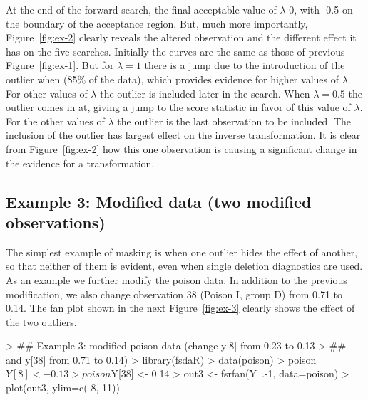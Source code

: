 \documentclass[article,shortnames,nojss]{jss}
\begin{document}
At the end of the forward search, the final acceptable value of $\lambda$ 0, with -0.5 on the boundary of the acceptance region. But, much more importantly, Figure~\ref{fig:ex-2} clearly reveals the altered observation and the different effect it has on the five searches. Initially the curves are the same as those of previous Figure~\ref{fig:ex-1}. But for $\lambda=1$ there is a jump due to the introduction of the outlier when (85\% of the data), which provides evidence for higher values of $\lambda$. For other values of $\lambda$ the outlier is included later in the search. When $\lambda=0.5$ the outlier comes in at, giving a jump to the score statistic in favor of this value of $\lambda$. For the other values of $\lambda$ the outlier is the last observation to be included. The inclusion of the outlier has  largest effect on the inverse transformation. It is clear from Figure~\ref{fig:ex-2} how this one observation is causing a significant change in the evidence for a transformation.

\subsection[Example 3: Modified poison data (two modified observations)]{Example 3: Modified  data (two modified observations)}

The simplest example of masking is when one outlier hides the effect of another, so that neither of them is evident, even when single deletion diagnostics are used. As an example we further modify the poison data. In addition to the previous modification, we also change observation 38 (Poison I, group D) from 0.71 to 0.14. The fan plot shown in the next Figure~\ref{fig:ex-3} clearly shows the effect of the two outliers.

\begin{Schunk}
\begin{Sinput}
> ##  Example 3: modified poison data (change y[8] from 0.23 to 0.13
> ##  and y[38] from 0.71 to 0.14)
> library(fsdaR)
> data(poison)
> poison$Y[8] <- 0.13
> poison$Y[38] <- 0.14
> out3 <- fsrfan(Y~.-1, data=poison)
> plot(out3, ylim=c(-8, 11))
\end{Sinput}
\end{Schunk}
\end{document}
